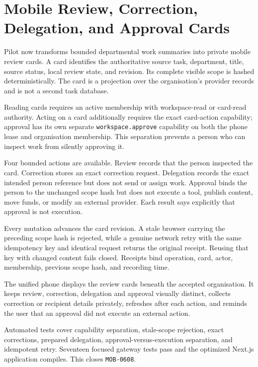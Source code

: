 \section{Mobile Review, Correction, Delegation, and Approval Cards}
\label{sec:pilot-mobile-workspace-cards}
\raggedright

Pilot now transforms bounded departmental work summaries into private mobile review cards.  A card
identifies the authoritative source task, department, title, source status, local review state, and
revision.  Its complete visible scope is hashed deterministically.  The card is a projection over
the organisation's provider records and is not a second task database.

Reading cards requires an active membership with workspace-read or card-read authority.  Acting on
a card additionally requires the exact card-action capability; approval has its own separate
\texttt{workspace.approve} capability on both the phone lease and organisation membership.  This
separation prevents a person who can inspect work from silently approving it.

Four bounded actions are available.  Review records that the person inspected the card.  Correction
stores an exact correction request.  Delegation records the exact intended person reference but
does not send or assign work.  Approval binds the person to the unchanged scope hash but does not
execute a tool, publish content, move funds, or modify an external provider.  Each result says
explicitly that approval is not execution.

Every mutation advances the card revision.  A stale browser carrying the preceding scope hash is
rejected, while a genuine network retry with the same idempotency key and identical request returns
the original receipt.  Reusing that key with changed content fails closed.  Receipts bind operation,
card, actor, membership, previous scope hash, and recording time.

The unified phone displays the review cards beneath the accepted organisation.  It keeps review,
correction, delegation and approval visually distinct, collects correction or recipient details
privately, refreshes after each action, and reminds the user that an approval did not execute an
external action.

Automated tests cover capability separation, stale-scope rejection, exact corrections, prepared
delegation, approval-versus-execution separation, and idempotent retry.  Seventeen focused gateway
tests pass and the optimized Next.js application compiles.  This closes \texttt{MOB-0608}.
